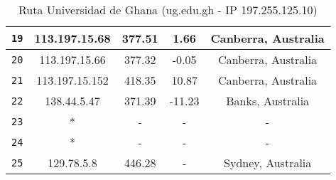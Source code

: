 \begin{table}[ht]
\begin{center}
\begin{tabular}{|c|c|c|c|c|}
    \texttt{19} & 113.197.15.68   & 377.51  & 1.66    & Canberra, Australia   \\ \hline
    \texttt{20} & 113.197.15.66   & 377.32  & -0.05   & Canberra, Australia   \\ \hline
    \texttt{21} & 113.197.15.152  & 418.35  & 10.87   & Canberra, Australia    \\ \hline
    \texttt{22} & 138.44.5.47     & 371.39  & -11.23  & Banks, Australia   \\ \hline
    \texttt{23} & *               & -       & -       & -                \\ \hline
    \texttt{24} & *               & -       & -       & -   \\ \hline
    \texttt{25} & 129.78.5.8      & 446.28  & -       & Sydney, Australia   \\ \hline
    \end{tabular}
    \caption{Ruta Universidad de Ghana (ug.edu.gh  - IP 197.255.125.10)}
\end{center}\end{table}


